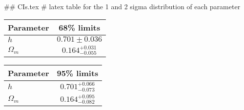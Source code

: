 ## CIs.tex
# latex table for the 1 and 2 sigma distribution of each parameter

\begin{tabular} { l  c}
 Parameter &  68\% limits\\
\hline
{\boldmath$h              $} & $0.701\pm 0.036            $\\
{\boldmath$\Omega_m       $} & $0.164^{+0.031}_{-0.055}   $\\
\hline
\end{tabular}

\begin{tabular} { l  c}
 Parameter &  95\% limits\\
\hline
{\boldmath$h              $} & $0.701^{+0.066}_{-0.073}   $\\
{\boldmath$\Omega_m       $} & $0.164^{+0.095}_{-0.082}   $\\
\hline
\end{tabular}
